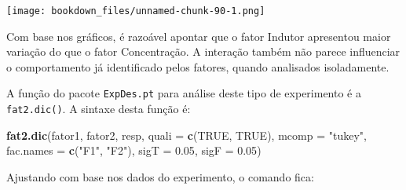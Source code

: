 \documentclass[
]{article}
\newenvironment{Shaded}{\begin{snugshade}}{\end{snugshade}}
\newcommand{\DataTypeTok}[1]{\textcolor[rgb]{0.13,0.29,0.53}{#1}}
\newcommand{\FloatTok}[1]{\textcolor[rgb]{0.00,0.00,0.81}{#1}}
\newcommand{\KeywordTok}[1]{\textcolor[rgb]{0.13,0.29,0.53}{\textbf{#1}}}
\newcommand{\NormalTok}[1]{#1}
\newcommand{\OperatorTok}[1]{\textcolor[rgb]{0.81,0.36,0.00}{\textbf{#1}}}
\newcommand{\OtherTok}[1]{\textcolor[rgb]{0.56,0.35,0.01}{#1}}
\newcommand{\StringTok}[1]{\textcolor[rgb]{0.31,0.60,0.02}{#1}}
\begin{document}
\begin{Shaded}
\end{Shaded}

\texttt{[image: bookdown\_files/unnamed-chunk-90-1.png]}

Com base nos gráficos, é razoável apontar que o fator Indutor apresentou maior variação do que o fator Concentração. A interação também não parece influenciar o comportamento já identificado pelos fatores, quando analisados isoladamente.

A função do pacote \texttt{ExpDes.pt} para análise deste tipo de experimento é a \texttt{fat2.dic()}. A sintaxe desta função é:

\begin{Shaded}
\begin{Highlighting}[]
\KeywordTok{fat2.dic}\NormalTok{(fator1, fator2, resp, }\DataTypeTok{quali =} \KeywordTok{c}\NormalTok{(}\OtherTok{TRUE}\NormalTok{, }\OtherTok{TRUE}\NormalTok{), }
         \DataTypeTok{mcomp =} \StringTok{"tukey"}\NormalTok{, }\DataTypeTok{fac.names =} \KeywordTok{c}\NormalTok{(}\StringTok{"F1"}\NormalTok{, }\StringTok{"F2"}\NormalTok{), }
         \DataTypeTok{sigT =} \FloatTok{0.05}\NormalTok{, }\DataTypeTok{sigF =} \FloatTok{0.05}\NormalTok{)}
\end{Highlighting}
\end{Shaded}

Ajustando com base nos dados do experimento, o comando fica:

\begin{Shaded}
\end{Shaded}
\end{document}
